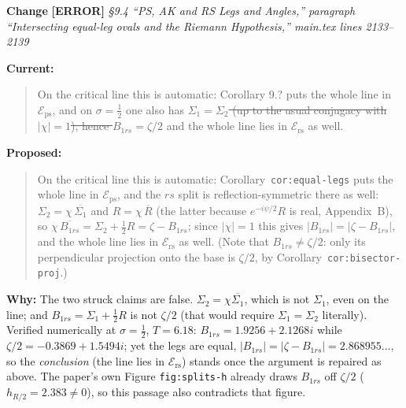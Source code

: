 \documentclass[11pt]{article}
\newcounter{chg}
\newcommand{\change}[3]{%
  \refstepcounter{chg}%
  \bigskip\par\noindent
  {\large\textbf{Change \thechg}}\quad
  {\color{#1}\textbf{[#2]}}\quad
  \textit{#3}\par\nobreak\smallskip}
\newenvironment{cur}{\par\noindent\textbf{Current:}\begin{quote}\color{delred}}{\end{quote}}
\newenvironment{prop}{\par\noindent\textbf{Proposed:}\begin{quote}\color{insblue}}{\end{quote}}
\newcommand{\why}[1]{\par\noindent\textbf{Why:} #1\par}
\newcommand{\zh}{\tfrac12}
\begin{document}
\change{tagerr}{ERROR}{\S{}9.4 ``PS, AK and RS Legs and Angles,'' paragraph
``Intersecting equal-leg ovals and the Riemann Hypothesis,'' main.tex
lines 2133--2139}
\begin{cur}
On the critical line this is automatic: Corollary 9.? puts the whole line in
$\mathcal{E}_{\mathrm{ps}}$, and on $\sigma=\zh$ one also has
\sout{$\Sigma_1=\Sigma_2$ (up to the usual conjugacy with $|\chi|=1$), hence
$B_{1rs}=\zeta/2$} and the whole line lies in
$\mathcal{E}_{\mathrm{rs}}$ as well.
\end{cur}
\begin{prop}
On the critical line this is automatic: Corollary~\texttt{cor:equal-legs} puts
the whole line in $\mathcal{E}_{\mathrm{ps}}$, and the $rs$ split is
reflection-symmetric there as well: $\Sigma_2=\chi\,\overline{\Sigma_1}$ and
$R=\chi\,\overline{R}$ (the latter because $e^{-i\psi/2}R$ is real,
Appendix~B), so
$\chi\,\overline{B_{1rs}}
 =\Sigma_2+\tfrac12R=\zeta-B_{1rs}$;
since $|\chi|=1$ this gives
$\bigl|B_{1rs}\bigr|=\bigl|\zeta-B_{1rs}\bigr|$, and the
whole line lies in $\mathcal{E}_{\mathrm{rs}}$ as well. (Note that
$B_{1rs}\neq\zeta/2$: only its perpendicular projection onto the base
is $\zeta/2$, by Corollary~\texttt{cor:bisector-proj}.)
\end{prop}
\why{The two struck claims are false. $\Sigma_2=\chi\overline{\Sigma_1}$, which
is not $\Sigma_1$, even on the line; and $B_{1rs}=\Sigma_1+\tfrac12R$
is not $\zeta/2$ (that would require $\Sigma_1=\Sigma_2$ literally).
Verified numerically at $\sigma=\zh$, $T=6.18$:
$B_{1rs}=1.9256+2.1268i$ while $\zeta/2=-0.3869+1.5494i$; yet the
legs are equal, $|B_{1rs}|=|\zeta-B_{1rs}|=2.868955\ldots$,
so the \emph{conclusion} (the line lies in $\mathcal{E}_{\mathrm{rs}}$) stands
once the argument is repaired as above. The paper's own Figure
\texttt{fig:splits-h} already draws $B_{1rs}$ off $\zeta/2$
($h_{R/2}=2.383\neq0$), so this passage also contradicts that figure.}
\end{document}
